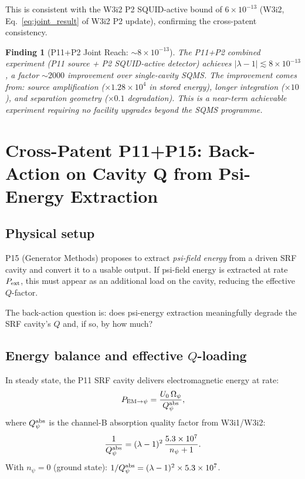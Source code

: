 \documentclass[11pt,twocolumn]{article}
\newcommand{\lam}{\lambda}
\newcommand{\Opsi}{\Omega_\psi}
\newcommand{\ee}[1]{\times 10^{#1}}
\newtheorem{finding}{Finding}[section]
\begin{document}
This is consistent with the W3i2 P2 SQUID-active bound of $6\ee{-13}$
(W3i2, Eq.~\eqref{eq:joint_result} of W3i2 P2 update), confirming
the cross-patent consistency.

\begin{finding}[P11+P2 Joint Reach: $\sim 8\ee{-13}$]
\label{find:joint_p11p2}
The P11+P2 combined experiment (P11 source + P2 SQUID-active detector)
achieves $|\lam-1| \lesssim 8\ee{-13}$, a factor $\sim 2000$ improvement
over single-cavity SQMS. The improvement comes from: source amplification
($\times 1.28\ee{4}$ in stored energy), longer integration ($\times 10$),
and separation geometry ($\times 0.1$ degradation). This is a near-term
achievable experiment requiring no facility upgrades beyond the SQMS
programme.
\end{finding}


\section{Cross-Patent P11+P15: Back-Action on Cavity Q from Psi-Energy Extraction}
\label{sec:back_action}

\subsection{Physical setup}

P15 (Generator Methods) proposes to extract \emph{psi-field energy}
from a driven SRF cavity and convert it to a usable output. If psi-field
energy is extracted at rate $P_{\rm ext}$, this must appear as an
additional load on the cavity, reducing the effective $Q$-factor.

The back-action question is: does psi-energy extraction meaningfully
degrade the SRF cavity's $Q$ and, if so, by how much?

\subsection{Energy balance and effective $Q$-loading}

In steady state, the P11 SRF cavity delivers electromagnetic energy
at rate:
\begin{equation}
P_{\rm EM\to\psi} = \frac{U_0\,\Opsi}{Q_\psi^{\rm abs}},
\label{eq:P_EM_to_psi}
\end{equation}
where $Q_\psi^{\rm abs}$ is the channel-B absorption quality factor
from W3i1/W3i2:
\begin{equation}
\frac{1}{Q_\psi^{\rm abs}} = (\lam-1)^2\,\frac{5.3\ee{7}}{n_\psi+1}.
\label{eq:Q_psi_abs}
\end{equation}
With $n_\psi = 0$ (ground state):
$1/Q_\psi^{\rm abs} = (\lam-1)^2\times5.3\ee{7}$.
\end{document}
